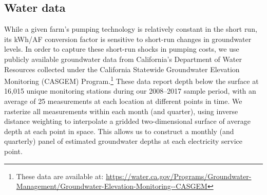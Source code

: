 \subsection{Water data}

While a given farm's pumping technology is relatively constant in the short run, its kWh/AF conversion factor is sensitive to short-run changes in groundwater levels. In order to capture these short-run shocks in pumping costs, we use publicly available groundwater data from California's Department of Water Resources collected under the California Statewide Groundwater Elevation Monitoring (CASGEM) Program.\footnote{
These data are available at: 
\url{https://water.ca.gov/Programs/Groundwater-Management/Groundwater-Elevation-Monitoring--CASGEM}
} 
These data report depth below the surface at 16,015 unique monitoring stations during our 2008--2017 sample period, with an average of 25 measurements at each location at different points in time. We rasterize all measurements within each month (and quarter), using inverse distance weighting to interpolate a gridded two-dimensional surface of average depth at each point in space. This allows us to construct a monthly (and quarterly) panel of estimated groundwater depths at each electricity service point.

